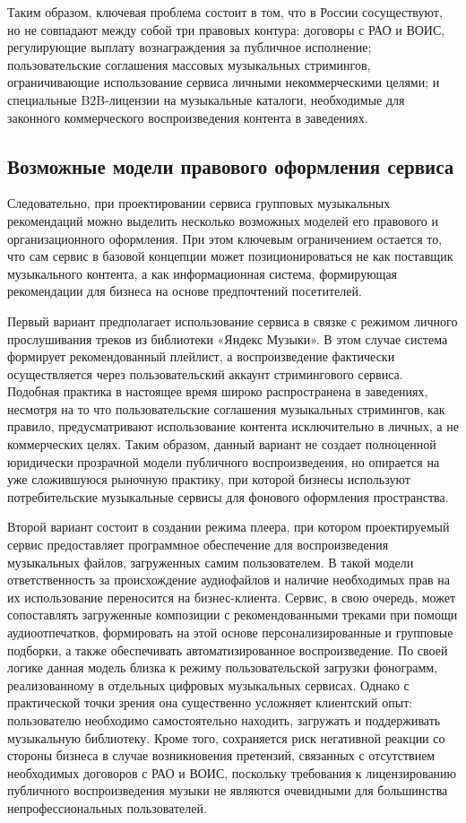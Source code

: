 Таким образом, ключевая проблема состоит в том, что в России сосуществуют, но не совпадают между собой три правовых контура: договоры с РАО и ВОИС, регулирующие выплату вознаграждения за публичное исполнение; пользовательские соглашения массовых музыкальных стримингов, ограничивающие использование сервиса личными некоммерческими целями; и специальные B2B-лицензии на музыкальные каталоги, необходимые для законного коммерческого воспроизведения контента в заведениях.

\subsection{Возможные модели правового оформления сервиса}

Следовательно, при проектировании сервиса групповых музыкальных рекомендаций можно выделить несколько возможных моделей его правового и организационного оформления. При этом ключевым ограничением остается то, что сам сервис в базовой концепции может позиционироваться не как поставщик музыкального контента, а как информационная система, формирующая рекомендации для бизнеса на основе предпочтений посетителей.

Первый вариант предполагает использование сервиса в связке с режимом личного прослушивания треков из библиотеки «Яндекс Музыки». В этом случае система формирует рекомендованный плейлист, а воспроизведение фактически осуществляется через пользовательский аккаунт стримингового сервиса. Подобная практика в настоящее время широко распространена в заведениях, несмотря на то что пользовательские соглашения музыкальных стримингов, как правило, предусматривают использование контента исключительно в личных, а не коммерческих целях. Таким образом, данный вариант не создает полноценной юридически прозрачной модели публичного воспроизведения, но опирается на уже сложившуюся рыночную практику, при которой бизнесы используют потребительские музыкальные сервисы для фонового оформления пространства.

Второй вариант состоит в создании режима плеера, при котором проектируемый сервис предоставляет программное обеспечение для воспроизведения музыкальных файлов, загруженных самим пользователем. В такой модели ответственность за происхождение аудиофайлов и наличие необходимых прав на их использование переносится на бизнес-клиента. Сервис, в свою очередь, может сопоставлять загруженные композиции с рекомендованными треками при помощи аудиоотпечатков, формировать на этой основе персонализированные и групповые подборки, а также обеспечивать автоматизированное воспроизведение. По своей логике данная модель близка к режиму пользовательской загрузки фонограмм, реализованному в отдельных цифровых музыкальных сервисах. Однако с практической точки зрения она существенно усложняет клиентский опыт: пользователю необходимо самостоятельно находить, загружать и поддерживать музыкальную библиотеку. Кроме того, сохраняется риск негативной реакции со стороны бизнеса в случае возникновения претензий, связанных с отсутствием необходимых договоров с РАО и ВОИС, поскольку требования к лицензированию публичного воспроизведения музыки не являются очевидными для большинства непрофессиональных пользователей.

